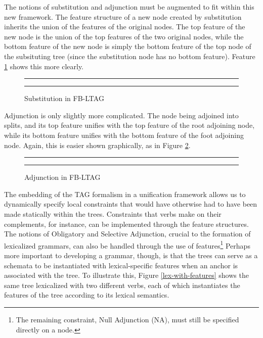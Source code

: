 The notions of substitution and adjunction must be augmented to fit within this
new framework.  The feature structure of a new node created by substitution
inherits the union of the features of the original nodes.  The top feature of
the new node is the union of the top features of the two original nodes, while
the bottom feature of the new node is simply the bottom feature of the top node
of the subsituting tree (since the substitution node has no bottom feature).
Feature \ref{subst-fig} shows this more clearly.

\begin{figure}[ht]
\centering
\rule[.1in]{\textwidth}{0.01in} 
\caption{Substitution in FB-LTAG}
\rule[.1in]{\textwidth}{0.01in} 
\label{subst-fig}
\end{figure}

Adjunction is only slightly more complicated.  The node being adjoined into
splits, and its top feature unifies with the top feature of the root
adjoining node, while its bottom feature unifies with the bottom feature of the
foot adjoining node.  Again, this is easier shown graphically, as in Figure
\ref{adjunct-fig}.

\begin{figure}[ht]
\centering
\rule[.1in]{\textwidth}{0.01in} 
\caption{Adjunction in FB-LTAG}
\label{adjunct-fig}
\rule[.1in]{\textwidth}{0.01in} 
\end{figure}


The embedding of the TAG formalism in a unification framework allows us to
dynamically specify local constraints that would have otherwise had to have
been made statically within the trees.  Constraints that verbs make on their
complements, for instance, can be implemented through the feature structures.
The notions of Obligatory and Selective Adjunction, crucial to the formation of
lexicalized grammars, can also be handled through the use of
features\footnote{The remaining constraint, Null Adjunction (NA), must still be
specified directly on a node.} Perhaps more important to developing a grammar,
though, is that the trees can serve as a schemata to be instantiated with
lexical-specific features when an anchor is associated with the tree.  To
illustrate this, Figure \ref{lex-with-features} shows the same tree lexicalized
with two different verbs, each of which instantiates the features of the tree
according to its lexical semantics.

